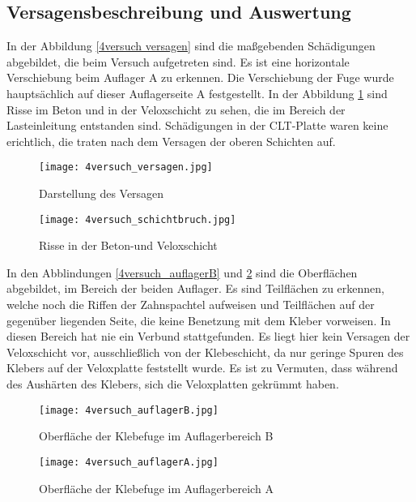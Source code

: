 \documentclass[12 pt,a4 paper ]{scrreprt}
\begin{document}
\subsection{Versagensbeschreibung und Auswertung}


In der Abbildung \ref{4versuch versagen} sind die maßgebenden Schädigungen abgebildet, die beim Versuch aufgetreten sind. Es ist eine horizontale Verschiebung beim Auflager A zu erkennen. Die Verschiebung der Fuge wurde hauptsächlich auf dieser  Auflagerseite A festgestellt. In der Abbildung \ref{4versuch_schichtbruch} sind Risse im Beton und in der Veloxschicht zu sehen, die im Bereich der Lasteinleitung entstanden sind. Schädigungen in der CLT-Platte waren keine erichtlich, die traten nach dem Versagen der oberen Schichten auf.  \\



\begin{figure}[h]
\begin{minipage}[hbt]{7cm}	
	\texttt{[image: 4versuch\_versagen.jpg]}
	\caption{Darstellung des Versagen}
	\label{4versuch versagen}
\end{minipage}
\hfill
\begin{minipage}[hbt]{7cm}
	\texttt{[image: 4versuch\_schichtbruch.jpg]}
	\caption{Risse in der Beton-und Veloxschicht}
	\label{4versuch_schichtbruch}
\end{minipage}
\end{figure}

In den Abblindungen \ref{4versuch_auflagerB} und \ref{4versuch_auflagerA} sind die Oberflächen abgebildet, im Bereich der beiden Auflager. Es sind Teilflächen zu erkennen, welche noch die Riffen der Zahnspachtel aufweisen und Teilflächen auf der gegenüber liegenden Seite, die keine Benetzung mit dem Kleber vorweisen. In diesen Bereich hat nie ein Verbund stattgefunden. Es liegt hier kein Versagen der Veloxschicht vor, ausschließlich von der Klebeschicht, da nur geringe Spuren des Klebers auf der Veloxplatte feststellt wurde. Es ist zu Vermuten, dass während des Aushärten des Klebers, sich die Veloxplatten gekrümmt haben. 



\begin{figure}[h]
\begin{minipage}[hbt]{7cm}	
	\texttt{[image: 4versuch\_auflagerB.jpg]}
	\caption{Oberfläche der Klebefuge im Auflagerbereich B}
	\label{4versuch_auflagerB}
\end{minipage}
\hfill
\begin{minipage}[hbt]{7cm}
	\texttt{[image: 4versuch\_auflagerA.jpg]}
	\caption{Oberfläche der Klebefuge im Auflagerbereich A}
	\label{4versuch_auflagerA}
\end{minipage}
\end{figure}
\end{document}
